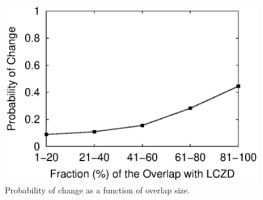 \begin{figure}
\begin{center}
\includegraphics[width=1.05\columnwidth]{figs/patching/probchange/probchange.eps}
\caption{Probability of change as a function of overlap size.}
\label{fig:overlap.change.prob}
\end{center}
\end{figure}


%
%
%
%
%
%


